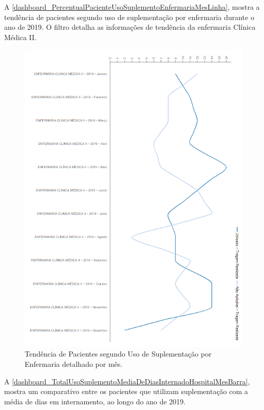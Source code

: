 \newpage
A \autoref{dashboard_PercentualPacienteUsoSuplementoEnfermariaMesLinha}, mostra a tendência de pacientes segundo uso de suplementação por enfermaria durante o ano de 2019.  O filtro detalha as informações de tendência da enfermaria Clínica Médica II.

\begin{figure}[htb]
	\caption{\label{dashboard_PercentualPacienteUsoSuplementoEnfermariaMesLinha}Tendência de Pacientes segundo Uso de Suplementação por Enfermaria detalhado por mês.}
	\begin{center}
	    \includegraphics[scale=0.9]{Imagens/4.4.PercentualPacienteUsoSuplementoEnfermariaMesLinha.png}
	\end{center}
\end{figure}

\newpage
A \autoref{dashboard_TotalUsoSuplementoMediaDeDiasInternadoHospitalMesBarra}, mostra um comparativo entre os pacientes que utilizam suplementação com a média de dias em internamento, ao longo do ano de 2019.


